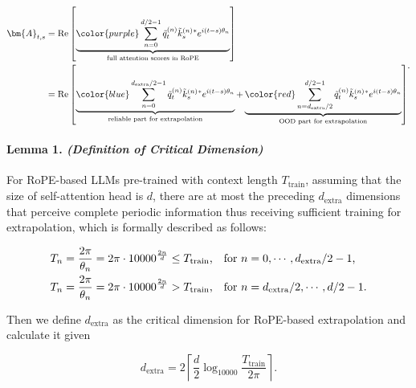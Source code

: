 \begin{equation}\begin{aligned}
\bm{A}_{t,s}&=\mathrm{Re}\left[\underbrace{\color{purple}\sum_{n=0}^{d/2-1}\tilde{q}_t^{\tiny(n)}\tilde{k}_s^{\tiny(n)}{}^{*}e^{i(t-s)\theta_n}}_\text{full attention scores in RoPE}\right] \\
&=\mathrm{Re}\left[{\underbrace{\color{blue}\sum_{n=0}^{d_\text{extra}/2-1}\tilde{q}_t^{\tiny(n)}\tilde{k}_s^{\tiny(n)}{}^{*}e^{i(t-s)\theta_n}}_\text{reliable part for extrapolation}+\underbrace{\color{red}\sum_{n=d_\text{extra}/2}^{d/2-1}\tilde{q}_t^{\tiny(n)}\tilde{k}_s^{\tiny(n)}{}^{*}e^{i(t-s)\theta_n}}_\text{OOD part for extrapolation}}\right]
\end{aligned}\text{.}\label{equ_ood}\end{equation}

\paragraph{Lemma 1. \textit{(Definition of Critical Dimension)} } For RoPE-based LLMs pre-trained with context length $T_\text{train}$, assuming that the size of self-attention head is $d$, there are at most the preceding $d_\text{extra}$ dimensions that perceive complete periodic information thus receiving sufficient training for extrapolation, which is formally described as follows:

\begin{equation}\begin{aligned}
T_n=\frac{2\pi}{\theta_n}=2\pi\cdot{10000}^{\frac{2n}{d}}\leq T_\text{train}\text{,} &\text{\quad for\ }n=0,\cdots,d_\text{extra}/2-1\text{,} \\
T_n=\frac{2\pi}{\theta_n}=2\pi\cdot{10000}^{\frac{2n}{d}}>T_\text{train}\text{,} &\text{\quad for\ }n=d_\text{extra}/2,\cdots,d/2-1\text{.} 
\end{aligned}\end{equation}

Then we define $d_\text{extra}$ as the critical dimension for RoPE-based extrapolation and calculate it given

\begin{equation}
    d_\text{extra}=2\left\lceil{\dfrac{d}{2}}\log_{10000}{\dfrac{T_\text{train}}{2\pi}}\right\rceil
\text{.}\label{equ_dim}\end{equation}

